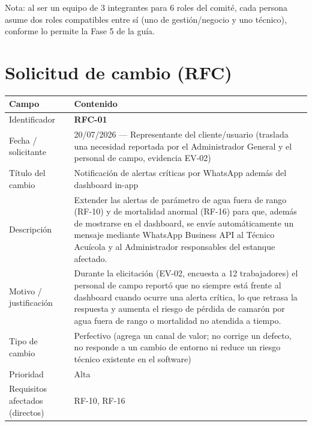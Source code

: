 \documentclass[11pt,a4paper]{article}
\begin{document}
Nota: al ser un equipo de 3 integrantes para 6 roles del comité, cada persona asume dos roles compatibles entre sí (uno de gestión/negocio y uno técnico), conforme lo permite la Fase 5 de la guía.

\section{Solicitud de cambio (RFC)}

\begin{longtable}{|p{4.5cm}|p{10cm}|}
\hline
\textbf{Campo} & \textbf{Contenido} \\ \hline
\endhead
Identificador & \textbf{RFC-01} \\ \hline
Fecha / solicitante & 20/07/2026 — Representante del cliente/usuario (traslada una necesidad reportada por el Administrador General y el personal de campo, evidencia EV-02) \\ \hline
Título del cambio & Notificación de alertas críticas por WhatsApp además del dashboard in-app \\ \hline
Descripción & Extender las alertas de parámetro de agua fuera de rango (RF-10) y de mortalidad anormal (RF-16) para que, además de mostrarse en el dashboard, se envíe automáticamente un mensaje mediante WhatsApp Business API al Técnico Acuícola y al Administrador responsables del estanque afectado. \\ \hline
Motivo / justificación & Durante la elicitación (EV-02, encuesta a 12 trabajadores) el personal de campo reportó que no siempre está frente al dashboard cuando ocurre una alerta crítica, lo que retrasa la respuesta y aumenta el riesgo de pérdida de camarón por agua fuera de rango o mortalidad no atendida a tiempo. \\ \hline
Tipo de cambio & Perfectivo (agrega un canal de valor; no corrige un defecto, no responde a un cambio de entorno ni reduce un riesgo técnico existente en el software) \\ \hline
Prioridad & Alta \\ \hline
Requisitos afectados (directos) & RF-10, RF-16 \\ \hline
\end{longtable}

\end{document}
